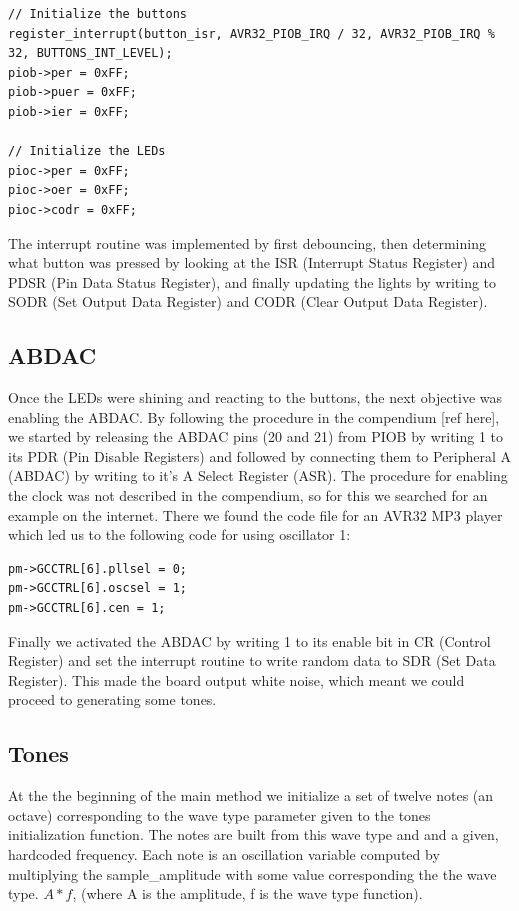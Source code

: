 \documentclass[a4paper,12pt]{article}
\begin{document}
\begin{verbatim}
// Initialize the buttons
register_interrupt(button_isr, AVR32_PIOB_IRQ / 32, AVR32_PIOB_IRQ % 32, BUTTONS_INT_LEVEL);
piob->per = 0xFF;
piob->puer = 0xFF;
piob->ier = 0xFF;

// Initialize the LEDs
pioc->per = 0xFF;
pioc->oer = 0xFF;
pioc->codr = 0xFF;
\end{verbatim}

The interrupt routine was implemented by first debouncing, then determining what button was pressed by looking at the ISR (Interrupt Status Register) and PDSR (Pin Data Status Register), and finally updating the lights by writing to SODR (Set Output Data Register) and CODR (Clear Output Data Register).

\subsection{ABDAC}

Once the LEDs were shining and reacting to the buttons, the next objective was enabling the ABDAC. By following the procedure in the compendium [ref here], we started by releasing the
ABDAC pins (20 and 21) from PIOB by writing 1 to its PDR (Pin Disable Registers) and followed by connecting them to Peripheral A (ABDAC) by writing to it’s A Select Register (ASR). The procedure for enabling the clock was not described in the compendium, so for this we searched for an example on the internet. There we found the code file for an AVR32 MP3 player \cite{clockex} which led us to the following code for using oscillator 1:

\begin{verbatim}
pm->GCCTRL[6].pllsel = 0;
pm->GCCTRL[6].oscsel = 1;
pm->GCCTRL[6].cen = 1;
\end{verbatim}

Finally we activated the ABDAC by writing 1 to its enable bit in CR (Control Register) and set the interrupt routine to write random data to SDR (Set Data Register). This made the board output white noise, which meant we could proceed to generating some tones.

\subsection{Tones}

At the the beginning of the main method we initialize a set of twelve notes (an octave) corresponding to the wave type parameter given to the tones initialization function. The notes are built from this wave type and and a given, hardcoded frequency. Each note is an oscillation variable computed by multiplying the sample\_amplitude with some value corresponding the the wave type. $A * f$, (where A is the amplitude, f is the wave type function).
\end{document}
